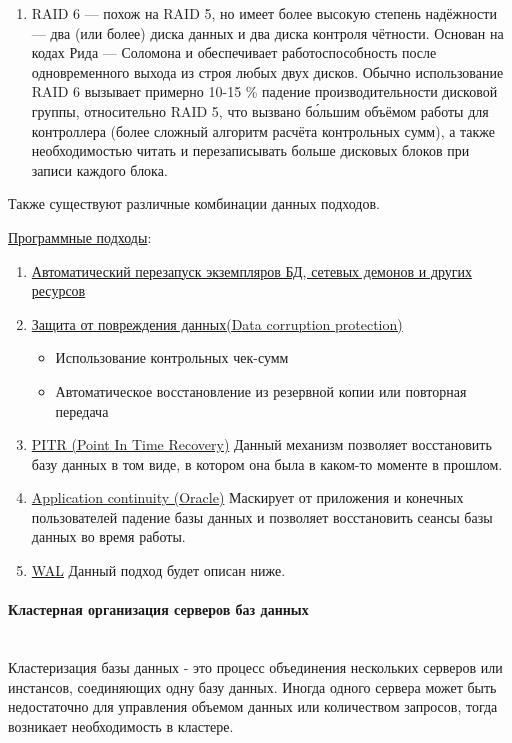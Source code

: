 \begin{enumerate}
\begin{enumerate}
         \item RAID 6 — похож на RAID 5, но имеет более высокую степень надёжности — два (или более) диска данных и два диска контроля чётности. Основан на кодах Рида — Соломона и обеспечивает работоспособность после одновременного выхода из строя любых двух дисков. Обычно использование RAID 6 вызывает примерно 10-15 \% падение производительности дисковой группы, относительно RAID 5, что вызвано б\'{о}льшим объёмом работы для контроллера (более сложный алгоритм расчёта контрольных сумм), а также необходимостью читать и перезаписывать больше дисковых блоков при записи каждого блока.
     \end{enumerate}
     Также существуют различные комбинации данных подходов.
\end{enumerate}
\underline{Программные подходы}:
\begin{enumerate}
    \item \underline{Автоматический перезапуск экземпляров БД, сетевых демонов и других ресурсов}
    \item \underline{Защита от повреждения данных(Data corruption protection)}
    \begin{itemize}
        \item Использование контрольных чек-сумм
        \item Автоматическое восстановление из резервной копии или повторная передача
    \end{itemize}
    \item \underline{PITR (Point In Time Recovery)} Данный механизм позволяет восстановить базу данных в том виде, в котором она была в каком-то моменте в прошлом.
    \item \underline{Application continuity (Oracle)} Маскирует от приложения и конечных пользователей падение базы данных и позволяет восстановить сеансы базы данных во время работы. 
    \item \underline{WAL} Данный подход будет описан ниже.
\end{enumerate}
\paragraph{Кластерная организация серверов баз данных}~\\
Кластеризация базы данных - это процесс объединения нескольких серверов или инстансов, соединяющих одну базу данных. Иногда одного сервера может быть недостаточно для управления объемом данных или количеством запросов, тогда возникает необходимость в кластере. 
 
